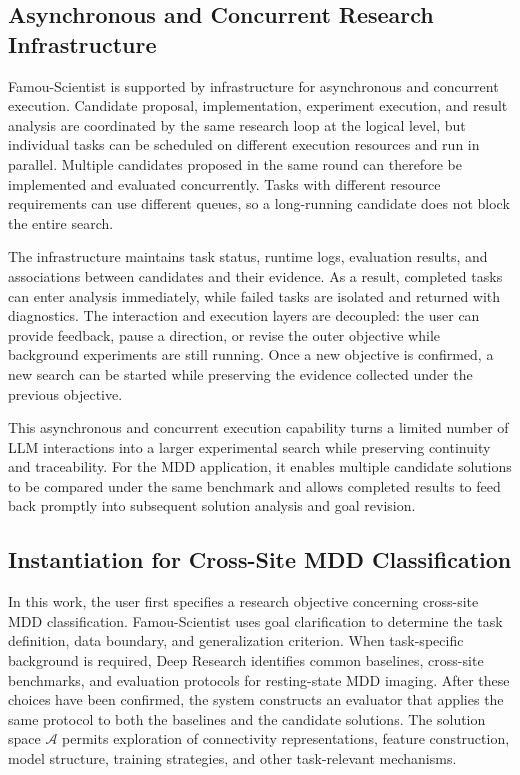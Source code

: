 \subsection{Asynchronous and Concurrent Research Infrastructure}
\label{sec:agent_infra}

Famou-Scientist is supported by infrastructure for asynchronous and concurrent execution. Candidate proposal, implementation, experiment execution, and result analysis are coordinated by the same research loop at the logical level, but individual tasks can be scheduled on different execution resources and run in parallel. Multiple candidates proposed in the same round can therefore be implemented and evaluated concurrently. Tasks with different resource requirements can use different queues, so a long-running candidate does not block the entire search.

The infrastructure maintains task status, runtime logs, evaluation results, and associations between candidates and their evidence. As a result, completed tasks can enter analysis immediately, while failed tasks are isolated and returned with diagnostics. The interaction and execution layers are decoupled: the user can provide feedback, pause a direction, or revise the outer objective while background experiments are still running. Once a new objective is confirmed, a new search can be started while preserving the evidence collected under the previous objective.

This asynchronous and concurrent execution capability turns a limited number of LLM interactions into a larger experimental search while preserving continuity and traceability. For the MDD application, it enables multiple candidate solutions to be compared under the same benchmark and allows completed results to feed back promptly into subsequent solution analysis and goal revision.

\subsection{Instantiation for Cross-Site MDD Classification}
\label{sec:agent_mdd}

In this work, the user first specifies a research objective concerning cross-site MDD classification. Famou-Scientist uses goal clarification to determine the task definition, data boundary, and generalization criterion. When task-specific background is required, Deep Research identifies common baselines, cross-site benchmarks, and evaluation protocols for resting-state MDD imaging. After these choices have been confirmed, the system constructs an evaluator that applies the same protocol to both the baselines and the candidate solutions. The solution space $\mathcal{A}$ permits exploration of connectivity representations, feature construction, model structure, training strategies, and other task-relevant mechanisms.


